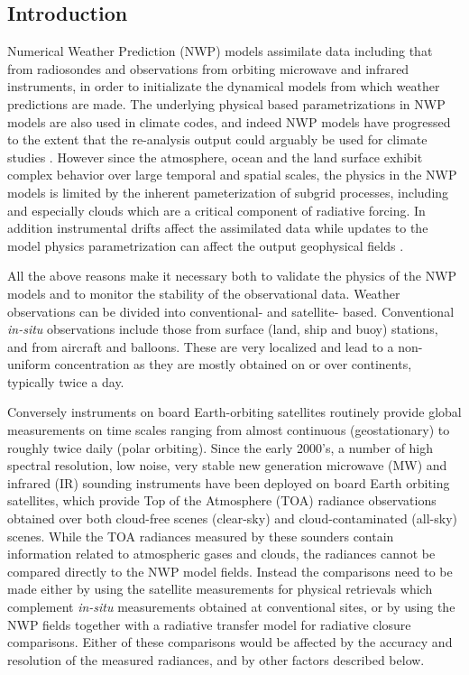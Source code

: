 \documentclass[agupp]{aguplus}              %
\begin{document}
\begin{article}

\section{Introduction}

Numerical Weather Prediction (NWP) models assimilate data including that 
from radiosondes  and observations from orbiting microwave
and infrared instruments, in order to initializate the dynamical
models from which weather predictions are made. The underlying
physical based parametrizations in NWP models are also used in climate
codes, and indeed NWP models have progressed to the extent that the
re-analysis output could arguably be used for climate studies
\citep{dee:11*1}. However since the atmosphere, ocean and the land
surface exhibit complex behavior over large temporal and spatial
scales, the physics in the NWP models is limited by the inherent
pameterization of subgrid processes, including and especially clouds
which are a critical component of radiative forcing. In addition
instrumental drifts affect the assimilated data while updates to
the model physics parametrization can affect the output geophysical
fields \cite{mor:91, sau:13}.

All the above reasons make it necessary both to validate the physics
of the NWP models and to monitor the stability of the observational
data. Weather observations can be divided into conventional- and
satellite- based. Conventional \emph{in-situ} observations include
those from surface (land, ship and buoy) stations, and from aircraft
and balloons. These are very localized and lead to a non-uniform
concentration as they are mostly obtained on or over continents,
typically twice a day.

Conversely instruments on board Earth-orbiting satellites routinely
provide global measurements on time scales ranging from almost
continuous (geostationary) to roughly twice daily (polar
orbiting). Since the early 2000's, a number of high spectral
resolution, low noise, very stable new generation microwave (MW) and
infrared (IR) sounding instruments have been deployed on board Earth
orbiting satellites, which provide Top of the Atmosphere (TOA)
radiance observations obtained over both cloud-free scenes (clear-sky)
and cloud-contaminated (all-sky) scenes. While the TOA radiances
measured by these sounders contain information related to atmospheric
gases and clouds, the radiances cannot be compared directly to the NWP
model fields. Instead the comparisons need to be made either by using
the satellite measurements for physical retrievals which complement
\emph{in-situ} measurements obtained at conventional sites, or by
using the NWP fields together with a radiative transfer model for
radiative closure comparisons. Either of these comparisons would be
affected by the accuracy and resolution of the measured radiances, and
by other factors described below.


\end{article}
\end{document}
